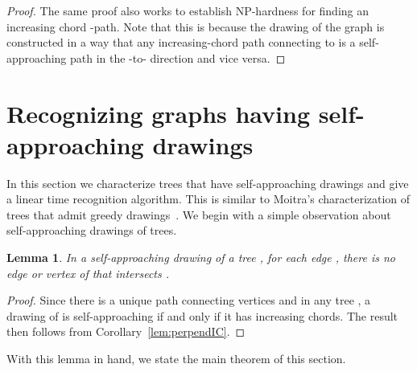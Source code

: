 \documentclass[11pt]{article}
\newtheorem{lemma}[theorem]{Lemma}
\newcommand{\changed}[1]{#1}
\newcommand{\ignore}[1]{}
\begin{document}
\begin{proof}
The same proof also works to establish NP-hardness for finding an increasing chord -path.  Note that this is because the drawing of the graph is constructed in a way that any increasing-chord path connecting  to  is a self-approaching path in the -to- direction and vice versa.
\end{proof}


\ignore{To prove this theorem, we reduce from 3SAT.  Our proof uses similar `cannons' and `targets' to those used in the proof of Theorem~\ref{thm:hardnesspath}, but this time, the cannons correspond to variable assignments and the targets correspond to literals in clauses.}



\section{Recognizing graphs having self-approaching drawings}
\label{sec:SADrawability}






In this section
{\changed we characterize trees that have self-approaching drawings and give a linear time recognition algorithm.
This is similar to Moitra's characterization of trees that admit greedy drawings~\cite{Moitra:Thesis:2009}.}  We begin with a simple observation about self-approaching drawings of trees.

\begin{lemma}
\label{lem:treeStrip}
In a self-approaching drawing of a tree , for each edge , there is no edge or vertex of  that intersects .
\end{lemma}
\begin{proof}
Since there is a unique path connecting vertices  and  in any tree , a drawing of  is self-approaching if and only if it has increasing chords.  The result then follows from Corollary~\ref{lem:perpendIC}.
\end{proof}




With this lemma in hand, we state the main theorem of this section.
\end{document}
